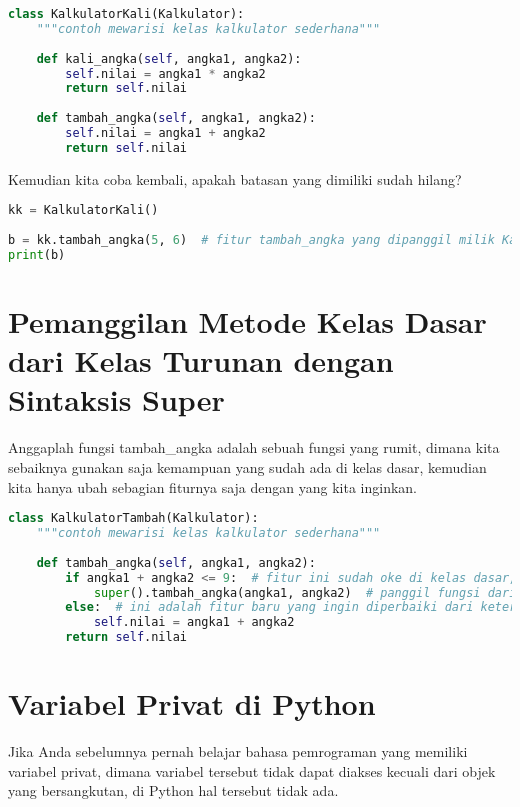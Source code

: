 \begin{lstlisting}[language=Python]
class KalkulatorKali(Kalkulator):
    """contoh mewarisi kelas kalkulator sederhana"""
 
    def kali_angka(self, angka1, angka2):
        self.nilai = angka1 * angka2
        return self.nilai
 
    def tambah_angka(self, angka1, angka2):
        self.nilai = angka1 + angka2
        return self.nilai
\end{lstlisting}

Kemudian kita coba kembali, apakah batasan yang dimiliki sudah hilang?

\begin{lstlisting}[language=Python]
kk = KalkulatorKali()
 
b = kk.tambah_angka(5, 6)  # fitur tambah_angka yang dipanggil milik KalkulatorKali
print(b)
\end{lstlisting}

\section{Pemanggilan Metode Kelas Dasar dari Kelas Turunan dengan Sintaksis Super}

Anggaplah fungsi tambah\_angka adalah sebuah fungsi yang rumit, dimana kita sebaiknya gunakan saja kemampuan yang sudah ada di kelas dasar, kemudian kita hanya ubah sebagian fiturnya saja dengan yang kita inginkan.
\begin{lstlisting}[language=Python]
class KalkulatorTambah(Kalkulator):
    """contoh mewarisi kelas kalkulator sederhana"""
 
    def tambah_angka(self, angka1, angka2):
        if angka1 + angka2 <= 9:  # fitur ini sudah oke di kelas dasar, gunakan yang ada saja
            super().tambah_angka(angka1, angka2)  # panggil fungsi dari Kalkulator lalu isi nilai
        else:  # ini adalah fitur baru yang ingin diperbaiki dari keterbatasan kelas dasar
            self.nilai = angka1 + angka2
        return self.nilai
\end{lstlisting}

\section{Variabel Privat di Python}

Jika Anda sebelumnya pernah belajar bahasa pemrograman yang memiliki variabel privat, dimana variabel tersebut tidak dapat diakses kecuali dari objek yang bersangkutan, di Python hal tersebut tidak ada.\\

